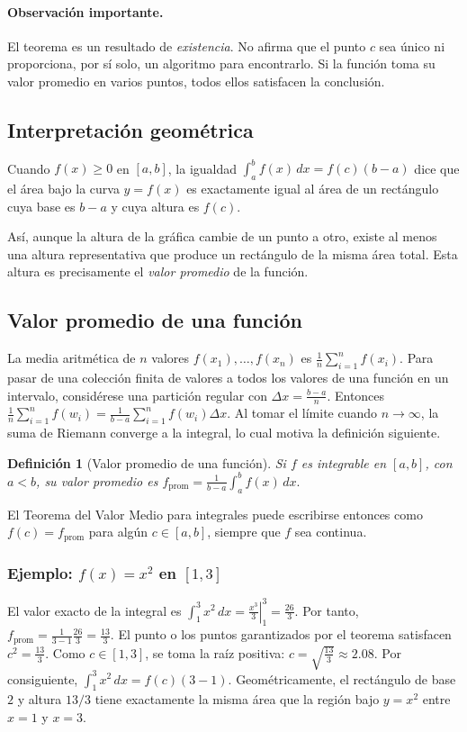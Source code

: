 \documentclass[12pt]{article}
\newtheorem{Def}{Definici\'on}
\begin{document}
\paragraph{Observación importante.}
El teorema es un resultado de \emph{existencia}. No afirma que el punto $c$
sea único ni proporciona, por sí solo, un algoritmo para encontrarlo. Si la
función toma su valor promedio en varios puntos, todos ellos satisfacen la
conclusión.
\subsection*{Interpretación geométrica}
Cuando $f(x)\ge0$ en $[a,b]$, la igualdad
$
\int_a^b f(x)\,dx=f(c)(b-a)
$
dice que el área bajo la curva $y=f(x)$ es exactamente igual al área de un
rectángulo cuya base es $b-a$ y cuya altura es $f(c)$.

Así, aunque la altura de la gráfica cambie de un punto a otro, existe al menos
una altura representativa que produce un rectángulo de la misma área total.
Esta altura es precisamente el \emph{valor promedio} de la función.
\subsection*{Valor promedio de una función}
La media aritmética de $n$ valores
$
f(x_1),\ldots,f(x_n)
$
es
$
\frac1n\sum_{i=1}^n f(x_i).
$
Para pasar de una colección finita de valores a todos los valores de una
función en un intervalo, considérese una partición regular con
$
\Delta x=\frac{b-a}{n}.
$
Entonces
$
\frac1n\sum_{i=1}^n f(w_i)
=
\frac{1}{b-a}\sum_{i=1}^n f(w_i)\Delta x.
$
Al tomar el límite cuando $n\to\infty$, la suma de Riemann converge a la
integral, lo cual motiva la definición siguiente.

\begin{Def}[Valor promedio de una función]
Si $f$ es integrable en $[a,b]$, con $a<b$, su valor promedio es
$
\boxed{
f_{\mathrm{prom}}
=\frac{1}{b-a}\int_a^b f(x)\,dx.
}
$
\end{Def}

El Teorema del Valor Medio para integrales puede escribirse entonces como
$
\boxed{f(c)=f_{\mathrm{prom}}}
$
para algún $c\in[a,b]$, siempre que $f$ sea continua.

\subsubsection*{Ejemplo: $f(x)=x^2$ en $[1,3]$}
El valor exacto de la integral es
$
\int_1^3x^2\,dx
=\left.\frac{x^3}{3}\right|_1^3
=\frac{26}{3}.
$
Por tanto,
$
f_{\mathrm{prom}}
=\frac{1}{3-1}\frac{26}{3}
=\boxed{\frac{13}{3}}.
$
El punto o los puntos garantizados por el teorema satisfacen
$
c^2=\frac{13}{3}.
$
Como $c\in[1,3]$, se toma la raíz positiva:
$
\boxed{c=\sqrt{\frac{13}{3}}\approx2.08.}
$
Por consiguiente,
$
\int_1^3x^2\,dx
=f(c)(3-1).
$
Geométricamente, el rectángulo de base $2$ y altura $13/3$ tiene exactamente
la misma área que la región bajo $y=x^2$ entre $x=1$ y $x=3$.
\end{document}
